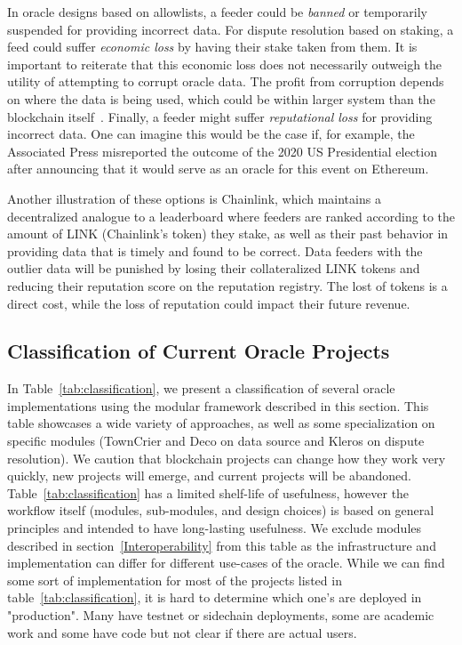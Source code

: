 In oracle designs based on allowlists, a feeder could be \textit{banned} or temporarily suspended for providing incorrect data. For dispute resolution based on staking, a feed could suffer \textit{economic loss} by having their stake taken from them. It is important to reiterate that this economic loss does not necessarily outweigh the utility of attempting to corrupt oracle data. The profit from corruption depends on where the data is being used, which could be within larger system than the blockchain itself~\cite{FoBo19}. Finally, a feeder might suffer \textit{reputational loss} for providing incorrect data. One can imagine this would be the case if, for example, the Associated Press misreported the outcome of the 2020 US Presidential election after announcing that it would serve as an oracle for this event on Ethereum.

Another illustration of these options is Chainlink, which maintains a decentralized analogue to a leaderboard where feeders are ranked according to the amount of LINK (Chainlink's token) they stake, as well as their past behavior in providing data that is timely and found to be correct. Data feeders with the outlier data will be punished by losing their collateralized LINK tokens and reducing their reputation score on the reputation registry. The lost of tokens is a direct cost, while the loss of reputation could impact their future revenue. 




\subsection{Classification of Current Oracle Projects} \label{oracle_categories}



In Table~\ref{tab:classification}, we present a classification of several oracle implementations using the modular framework described in this section. This table showcases a wide variety of approaches, as well as some specialization on specific modules (\eg TownCrier and Deco on data source and Kleros on dispute resolution). We caution that blockchain projects can change how they work very quickly, new projects will emerge, and current projects will be abandoned. Table~\ref{tab:classification} has a limited shelf-life of usefulness, however the workflow itself (modules, sub-modules, and design choices) is based on general principles and intended to have long-lasting usefulness. We exclude modules described in section~\ref{Interoperability} from this table as the infrastructure and implementation can differ for different use-cases of the oracle.
While we can find some sort of implementation for most of the projects listed in table~\ref{tab:classification}, it is hard to determine which one's are deployed in "production". Many have testnet or sidechain deployments, some are academic work and some have code but not clear if there are actual users.

